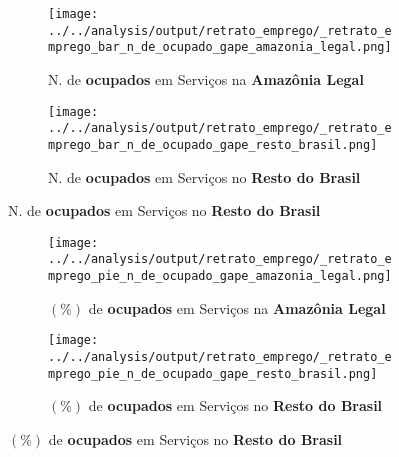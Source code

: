 \documentclass[11pt]{beamer}
\begin{document}
\begin{frame}[label=_retrato_emprego_bar_n_de_ocupado_gape]{}
\textit{\hyperlink{indice_principal}{}}
\begin{figure}
\centering
\begin{subfigure}{.5\textwidth}
  \centering
  \texttt{[image: ../../analysis/output/retrato\_emprego/\_retrato\_emprego\_bar\_n\_de\_ocupado\_gape\_amazonia\_legal.png]}
  \label{fig:_retrato_emprego_bar_n_de_ocupado_gape_amazonia_legal}
  \caption{{\tiny N. de \textbf{ocupados} em Serviços na \textbf{Amazônia Legal}}}
\end{subfigure}%
\begin{subfigure}{.5\textwidth}
  \centering
  \texttt{[image: ../../analysis/output/retrato\_emprego/\_retrato\_emprego\_bar\_n\_de\_ocupado\_gape\_resto\_brasil.png]}
  \label{fig:_retrato_emprego_bar_n_de_ocupado_gape_resto_brasil}
   \caption{{\tiny N. de \textbf{ocupados} em Serviços no \textbf{Resto do Brasil}}}
\end{subfigure}
\end{figure}
\end{frame}

\begin{frame}[label=_retrato_emprego_pie_n_de_ocupado_gape]{}
\textit{\hyperlink{indice_principal}{}}
\begin{figure}
\centering
\begin{subfigure}{.5\textwidth}
  \centering
  \texttt{[image: ../../analysis/output/retrato\_emprego/\_retrato\_emprego\_pie\_n\_de\_ocupado\_gape\_amazonia\_legal.png]}
  \label{fig:_retrato_emprego_pie_n_de_ocupado_gape_amazonia_legal}
  \caption{{\tiny $(\%)$ de \textbf{ocupados} em Serviços na \textbf{Amazônia Legal}}}
\end{subfigure}%
\begin{subfigure}{.5\textwidth}
  \centering
  \texttt{[image: ../../analysis/output/retrato\_emprego/\_retrato\_emprego\_pie\_n\_de\_ocupado\_gape\_resto\_brasil.png]}
  \label{fig:_retrato_emprego_pie_n_de_ocupado_gape_resto_brasil}
   \caption{{\tiny $(\%)$ de \textbf{ocupados} em Serviços no \textbf{Resto do Brasil}}}
\end{subfigure}
\end{figure}
\end{frame}
\end{document}
